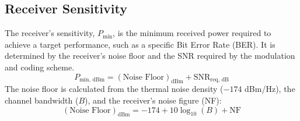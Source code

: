 \subsection{Receiver Sensitivity}

The receiver's sensitivity, $P_{\text{min}}$, is the minimum received power required to achieve a target performance, such as a specific Bit Error Rate (BER). It is determined by the receiver's noise floor and the SNR required by the modulation and coding scheme.
\begin{equation}
    P_{\text{min, dBm}} = (\text{Noise Floor})_{\text{dBm}} + \text{SNR}_{\text{req, dB}}
\end{equation}
The noise floor is calculated from the thermal noise density ($-174$ dBm/Hz), the channel bandwidth ($B$), and the receiver's noise figure (NF):
\begin{equation}
    (\text{Noise Floor})_{\text{dBm}} = -174 + 10\log_{10}(B) + \text{NF}
\end{equation}


